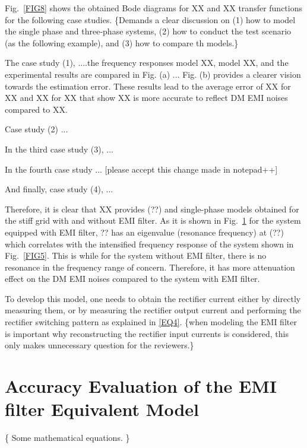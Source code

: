 \documentclass[journal,a4paper,10pt,twoside]{IEEEtran} %
\begin{document}
    
    
    
    
    Fig.~\ref{FIG8} shows the obtained Bode diagrams for XX and XX transfer functions for the following case studies. {\color{red} \{Demands a clear discussion on (1) how to model the single phase and three-phase systems, (2) how to conduct the test scenario (as the following example), and (3) how to compare th models.\}}
	
	
	The case study (1), ....the frequency responses model XX, model XX, and the experimental results are compared in Fig. (a) ... Fig. (b) provides a clearer vision towards the estimation error. These results lead to the average error of XX for XX and XX for XX that show XX is more accurate to reflect DM EMI noises compared to XX.
	
	Case study (2) ...
	
	In the third case study (3), ...
	
	In the fourth case study ... [please accept this change made in notepad++]
	
	And finally, case study (4), ...
	
	Therefore, it is clear that XX provides 
	(??) and single-phase models obtained for the stiff grid with and without EMI filter. As it is shown in Fig.~\ref{} for the system equipped with EMI filter, ?? has an eigenvalue (resonance frequency) at (??) which correlates with the intensified frequency response of the system shown in Fig.~\ref{FIG5}. This is while for the system without EMI filter, there is no resonance in the frequency range of concern. Therefore, it has more attenuation effect on the DM EMI noises compared to the system with EMI filter. 
	
	To develop this model, one needs to obtain the rectifier current either by directly measuring them, or by measuring the rectifier output current and performing the rectifier switching pattern as explained in \eqref{EQ4}. {\color{red} \{when modeling the EMI filter is important why reconstructing the rectifier input currents is considered, this only makes unnecessary question for the reviewers.\}}
	
	\section{Accuracy Evaluation of the EMI filter Equivalent Model}
	
	{\color{blue} \{ Some mathematical equations. \}} 
	
	
	
\end{document}
